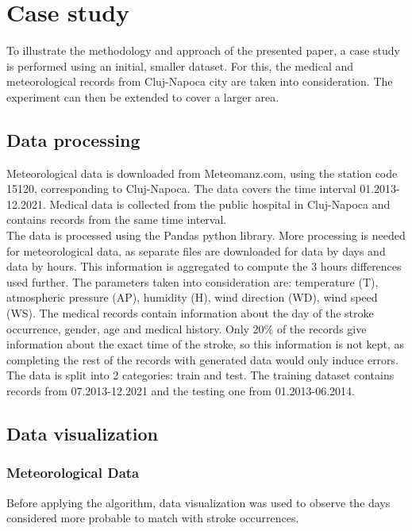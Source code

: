 \documentclass{article}
\begin{document}
\section{Case study}

To illustrate the methodology and approach of the presented paper, a case study is performed using an initial, smaller dataset. For this, the medical and meteorological records from Cluj-Napoca city are taken into consideration. The experiment can then be extended to cover a larger area.

\subsection{Data processing}

Meteorological data is downloaded from Meteomanz.com, using the station code 15120, corresponding to Cluj-Napoca. The data covers the time interval 01.2013-12.2021. Medical data is collected from the public hospital in Cluj-Napoca and contains records from the same time interval.
\\

The data is processed using the Pandas python library. More processing is needed for meteorological data, as separate files are downloaded for data by days and data by hours. This information is aggregated to compute the 3 hours differences used further. The parameters taken into consideration are: temperature (T), atmospheric pressure (AP), humidity (H), wind direction
(WD), wind speed (WS). The medical records contain information about the day of the stroke occurrence, gender, age and medical history. Only 20\% of the records give information about the exact time of the stroke, so this information is not kept, as completing the rest of the records with generated data would only induce errors. The data is split into 2 categories: train and test. The training dataset contains records from 07.2013-12.2021 and the testing one from 01.2013-06.2014. 

\subsection{Data visualization}

\subsubsection{Meteorological Data}

Before applying the algorithm, data visualization was used to observe the days considered more probable to match with stroke occurrences. 
\end{document}
